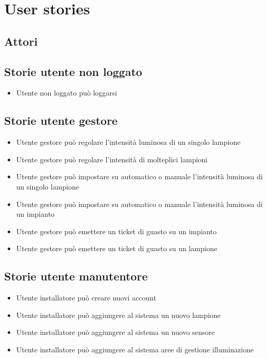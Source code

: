 \chapter{User stories}

\section{Attori}\label{attori}

\section{Storie utente non loggato}

\begin{itemize}
    \item Utente non loggato può loggarsi
\end{itemize}

\section{Storie utente gestore}

\begin{itemize}
    \item Utente gestore può regolare l'intensità luminosa di un singolo lampione
    \item Utente gestore può regolare l'intensità di molteplici lampioni
    \item Utente gestore può impostare su automatico o manuale l'intensità luminosa di un singolo lampione
    \item Utente gestore può impostare su automatico o manuale l'intensità luminosa di un impianto
    \item Utente gestore può emettere un ticket di guasto su un impianto
    \item Utente gestore può emettere un ticket di guasto su un lampione
\end{itemize}



\section{Storie utente manutentore}
\begin{itemize}
    \item Utente installatore può creare nuovi account
    \item Utente installatore può aggiungere al sistema un nuovo lampione
    \item Utente installatore può aggiungere al sistema un nuovo sensore
    \item Utente installatore può aggiungere al sistema aree di gestione illuminazione
\end{itemize}


